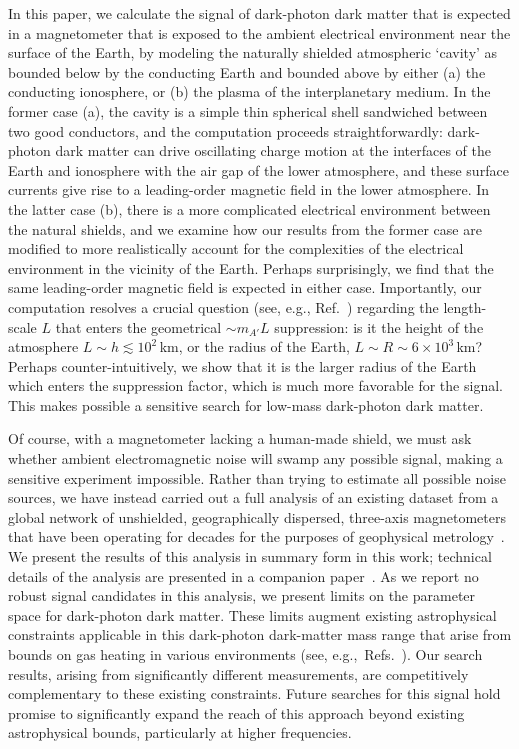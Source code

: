 \documentclass[amsmath,amssymb,aps,10pt,prd,letterpaper,nofootinbib,balancelastpage,notitlepage,superscriptaddress,twocolumn,floatfix]{revtex4-2}
\newcommand{\citeR}[2][]{Ref{#1}.~\cite{#2}}		%
\begin{document}
In this paper, we calculate the signal of dark-photon dark matter that is expected in a magnetometer that is exposed to the ambient electrical environment near the surface of the Earth, by modeling the naturally shielded atmospheric `cavity' as bounded below by the conducting Earth and bounded above by either (a) the conducting ionosphere, or (b) the plasma of the interplanetary medium. 
In the former case (a), the cavity is a simple thin spherical shell sandwiched between two good conductors, and the computation proceeds straightforwardly: dark-photon dark matter can drive oscillating charge motion at the interfaces of the Earth and ionosphere with the air gap of the lower atmosphere, and these surface currents give rise to a leading-order magnetic field in the lower atmosphere.
In the latter case (b), there is a more complicated electrical environment between the natural shields, and we examine how our results from the former case are modified to more realistically account for the complexities of the electrical environment in the vicinity of the Earth.
Perhaps surprisingly, we find that the same leading-order magnetic field is expected in either case.
Importantly, our computation resolves a crucial question (see, e.g., \citeR{Dubovsky:2015cca}) regarding the length-scale $L$ that enters the geometrical $\sim m_{A'} L$ suppression: is it the height of the atmosphere $L \sim h \lesssim 10^2\,$km, or the radius of the Earth, $L\sim R\sim 6\times 10^3\,$km?
Perhaps counter-intuitively, we show that it is the larger radius of the Earth which enters the suppression factor, which is much more favorable for the signal.
This makes possible a sensitive search for low-mass dark-photon dark matter.

Of course, with a magnetometer lacking a human-made shield, we must ask whether ambient electromagnetic noise will swamp any possible signal, making a sensitive experiment impossible. 
Rather than trying to estimate all possible noise sources, we have instead carried out a full analysis of an existing dataset from a global network of unshielded, geographically dispersed, three-axis magnetometers that have been operating for decades for the purposes of geophysical metrology~\cite{SuperMAGwebsite,Gjerloev:2009wsd,Gjerloev:2012sdg}.
We present the results of this analysis in summary form in this work; technical details of the analysis are presented in a companion paper~\cite{Fedderke:2021qva}. 
As we report no robust signal candidates in this analysis, we present limits on the parameter space for dark-photon dark matter.
These limits augment existing astrophysical constraints applicable in this dark-photon dark-matter mass range that arise from bounds on gas heating in various environments (see,  e.g.,~\citeR[s]{Dubovsky:2015cca,Bhoonah:2018gjb,McDermott:2019lch,Wadekar:2019xnf,Kovetz:2018zes}).
Our search results, arising from significantly different measurements, are competitively complementary to these existing constraints.
Future searches for this signal hold promise to significantly expand the reach of this approach beyond existing astrophysical bounds, particularly at higher frequencies.
\end{document}
